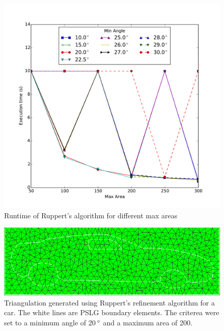 \begin{figure}[ht]
    \centering
    \includegraphics[width=\columnwidth]{../images/ruppert2.pdf}
    \caption{Runtime of Ruppert's algorithm for different max areas}
    \label{fig:ruppert-runtime2}
\end{figure}

\begin{figure}
    \centering
    \includegraphics[width=\columnwidth]{../images/Car_Ruppert20.png}
    \caption{Triangulation generated using Ruppert's refinement algorithm for a car. The white lines are PSLG boundary elements.
    The criterea were set to a minimum angle of 20$\,^{\circ}$ and a maximum area of 200.}
    \label{fig:result_Car20}
\end{figure}

